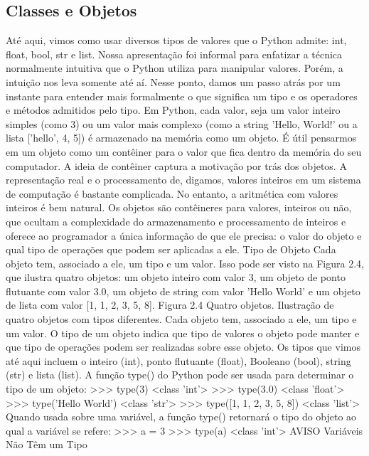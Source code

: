 			\subsection{Classes e Objetos}
			Até aqui, vimos como usar diversos tipos de valores que o Python
			admite: int, float, bool, str e list. Nossa apresentação foi informal para enfatizar a
			técnica normalmente intuitiva que o Python utiliza para manipular valores. Porém, a intuição nos
			leva somente até aí. Nesse ponto, damos um passo atrás por um instante para entender mais
			formalmente o que significa um tipo e os operadores e métodos admitidos pelo tipo.
			Em Python, cada valor, seja um valor inteiro simples (como 3) ou um valor mais complexo
			(como a string 'Hello, World!' ou a lista ['hello', 4, 5]) é armazenado na memória
			como um objeto. É útil pensarmos em um objeto como um contêiner para o valor que fica dentro
			da memória do seu computador.
			A ideia de contêiner captura a motivação por trás dos objetos. A representação real e o
			processamento de, digamos, valores inteiros em um sistema de computação é bastante complicada.
			No entanto, a aritmética com valores inteiros é bem natural. Os objetos são contêineres para
			valores, inteiros ou não, que ocultam a complexidade do armazenamento e processamento de
			inteiros e oferece ao programador a única informação de que ele precisa: o valor do objeto e qual
			tipo de operações que podem ser aplicadas a ele.
			Tipo de Objeto
			Cada objeto tem, associado a ele, um tipo e um valor. Isso pode ser visto na Figura 2.4, que ilustra
			quatro objetos: um objeto inteiro com valor 3, um objeto de ponto flutuante com valor 3.0, um
			objeto de string com valor 'Hello World' e um objeto de lista com valor [1, 1, 2, 3,
			5, 8].
			Figura 2.4 Quatro objetos. Ilustração de quatro objetos com tipos diferentes. Cada objeto tem,
			associado a ele, um tipo e um valor.
			O tipo de um objeto indica que tipo de valores o objeto pode manter e que tipo de operações
			podem ser realizadas sobre esse objeto. Os tipos que vimos até aqui incluem o inteiro (int),
			ponto flutuante (float), Booleano (bool), string (str) e lista (list). A função type() do
			Python pode ser usada para determinar o tipo de um objeto:
			>>> type(3)
			<class 'int'>
			>>> type(3.0)
			<class 'float'>
			>>> type('Hello World')
			<class 'str'>
			>>> type([1, 1, 2, 3, 5, 8])
			<class 'list'>
			Quando usada sobre uma variável, a função type() retornará o tipo do objeto ao qual a variável
			se refere:
			>>> a = 3
			>>> type(a)
			<class 'int'>
			AVISO Variáveis Não Têm um Tipo
